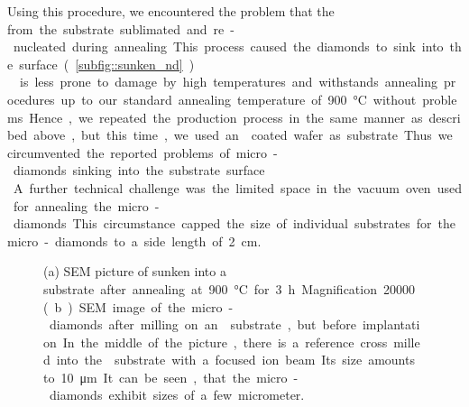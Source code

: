 	Using this procedure, we encountered the problem that the \si from the substrate sublimated and re-nucleated during annealing.
	This process caused the diamonds to sink into the \si surface (\autoref{subfig::sunken_nd}).
	\\
	\Ir is less prone to damage by high temperatures and withstands annealing procedures up to our standard annealing temperature of \SI{900}{\celsius} without problems.
	Hence, we repeated the production process in the same manner as described above, but this time, we used an \ir coated \si wafer as substrate. 
	Thus we circumvented the reported problems of micro-diamonds sinking into the substrate surface.
	\\
	A further technical challenge was the limited space in the vacuum oven used for annealing the micro-diamonds. 
	This circumstance capped the size of individual substrates for the micro-diamonds to a side length of \SI{2}{cm}.

	\begin{figure}[htp]
		\begin{subfigure}[t]{ 0.49\linewidth}
			\centering
			\caption{}\label{subfig::sunken_nd}
		\end{subfigure}
		\hfill
		\begin{subfigure}[t]{ 0.49\linewidth}
			\centering
			\caption{}\label{subfig::microdiamonds}
		\end{subfigure}
		\caption{(a) SEM picture of \nds sunken into a \si substrate after annealing at \SI{900}{\celsius} for \SI{3}{h}. Magnification \num{20000}. (b) SEM image of the micro-diamonds after milling on an \ir substrate, but before implantation. In the middle of the picture, there is a reference cross milled into the \ir substrate with a focused ion beam. Its size amounts to \SI{10}{\micro\meter}. It can be seen, that the micro-diamonds exhibit sizes of a few micrometer.}
		\label{fig::<fig>}
	\end{figure}

